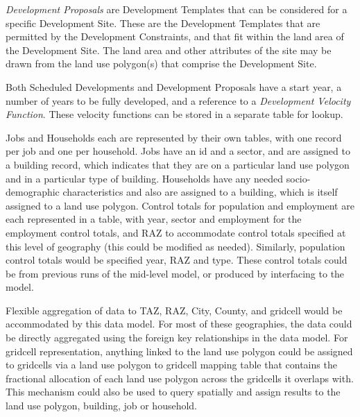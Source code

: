 \emph{Development Proposals} are Development Templates that can be considered for a specific
Development Site.  These are the Development Templates that are permitted by the Development
Constraints, and that fit within the land area of the Development Site.  The land area and other attributes
of the site may be drawn from the land use polygon(s) that comprise the Development Site.

Both Scheduled Developments and Development Proposals have a start year, a number of years to 
be fully developed, and a reference to a \emph{Development Velocity Function}.  These velocity
functions can be stored in a separate table for lookup.

Jobs and Households each are represented by their own tables, with one record per job and one per
 household.  Jobs have an id and a sector, and are assigned to a building record, which indicates that
they are on a particular land use polygon and in a particular type of building.  Households have
any needed socio-demographic characteristics and also are assigned to a building, which is 
itself assigned to a land use polygon.  Control totals for population and employment are each
represented in a table, with year, sector and employment for the employment control totals, and RAZ
to accommodate control totals specified at this level of geography (this could be modified as needed).
Similarly, population control totals would be specified year, RAZ and type.  These control totals could be
from previous runs of the mid-level model, or produced by interfacing to the model.

Flexible aggregation of data to TAZ, RAZ, City, County, and gridcell would be accommodated by this 
data model.  For most of these geographies, the data could be directly aggregated using the foreign
key relationships in the data model.  For gridcell representation, anything linked to the land use polygon
could be assigned to gridcells via a land use polygon to gridcell mapping table that contains the
fractional allocation of each land use polygon across the gridcells it overlaps with.  This mechanism
could also be used to query spatially and assign results to the land use polygon, building, job or household.

